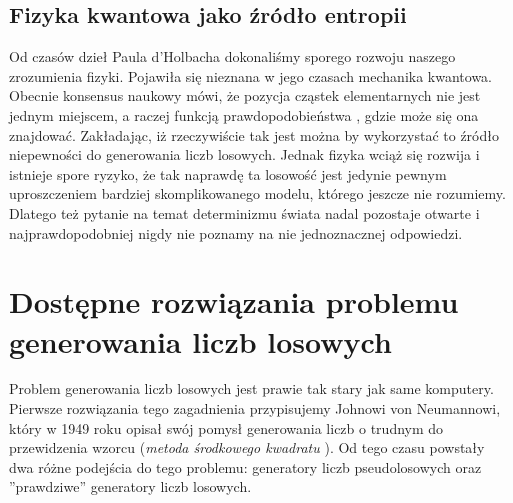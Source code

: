 \subsection{Fizyka kwantowa jako źródło entropii}
Od czasów dzieł Paula d'Holbacha dokonaliśmy sporego rozwoju naszego zrozumienia fizyki. Pojawiła się nieznana w jego czasach mechanika kwantowa. Obecnie konsensus naukowy mówi, że pozycja cząstek elementarnych nie jest jednym miejscem, a raczej funkcją prawdopodobieństwa \cite{Quantum}, gdzie może się ona znajdować. Zakładając, iż rzeczywiście tak jest można by wykorzystać to źródło niepewności do generowania liczb losowych. Jednak fizyka wciąż się rozwija i istnieje spore ryzyko, że tak naprawdę ta losowość jest jedynie pewnym uproszczeniem bardziej skomplikowanego modelu, którego jeszcze nie rozumiemy. Dlatego też pytanie na temat determinizmu świata nadal pozostaje otwarte i najprawdopodobniej nigdy nie poznamy na nie jednoznacznej odpowiedzi.

\section{Dostępne rozwiązania problemu generowania liczb losowych}
Problem generowania liczb losowych jest prawie tak stary jak same komputery. Pierwsze rozwiązania tego zagadnienia przypisujemy Johnowi von Neumannowi, który w 1949 roku opisał swój pomysł generowania liczb o trudnym do przewidzenia wzorcu (\emph{metoda środkowego kwadratu} \cite{msm}). Od tego czasu powstały dwa różne podejścia do tego problemu: generatory liczb pseudolosowych oraz ''prawdziwe'' generatory liczb losowych.
